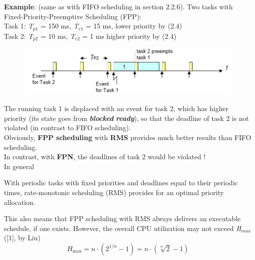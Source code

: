 \textbf{Example}: (same as with FIFO scheduling in section 2.2.6). Two tasks with Fixed-Priority-Preemptive Scheduling (FPP):\\

Task 1: \textit{T}${}_{p1}$ = 150 ms, \textit{T}${}_{e1}$ = 15 ms,   lower priority by   (2.4)\\
Task 2: \textit{T}${}_{p2}$ = 10 ms,  \textit{T}${}_{e2}$ = 1 ms   higher priority by (2.4)\\

 	\begin{figure}[h]
    \centering
    \includegraphics[width=12cm, height=2.5cm]{Images/image99.png}
    \label{fig:Fig 44}
    \end{figure}

The running task 1 is displaced with an event for task 2, which has higher priority (its state goes from \textbf{\textit{blocked}}  \textbf{\textit{ready}}), so that the deadline of task 2 is not violated (in contrast to FIFO scheduling).\\

Obviously,\textbf{ FPP scheduling} with \textbf{RMS} provides much better results than FIFO scheduling. \\

In contrast, with \textbf{FPN}, the deadlines of task 2 would be violated !\\

In general

\begin{tcolorbox}[colback=blue!5!white,colframe=blue!75!black]
 	With periodic tasks with fixed priorities and deadlines equal to their periodic times, rate-monotonic scheduling (RMS) provides for an optimal priority allocation.
\end{tcolorbox}

This also means that FPP scheduling with RMS always delivers an executable schedule, if one exists. However, the overall CPU utilization may not exceed \textit{H${}_{max}$ }([1], by Liu)\\

\begin{equation}
	H_{\max } =n\cdot \left(2^{1/n} -1\right)=n\cdot \left(\sqrt[{n}]{2} -1\right) 
\label{EQ }
\end{equation}


